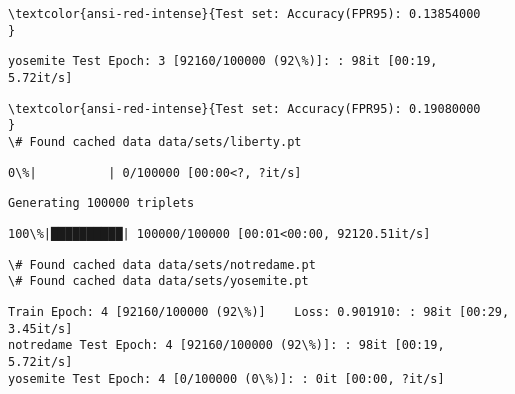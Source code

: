 \documentclass[11pt]{article}
\begin{document}
    \begin{Verbatim}[commandchars=\\\{\}]
\textcolor{ansi-red-intense}{Test set: Accuracy(FPR95): 0.13854000
}

    \end{Verbatim}

    \begin{Verbatim}[commandchars=\\\{\}]
yosemite Test Epoch: 3 [92160/100000 (92\%)]: : 98it [00:19,  5.72it/s]

    \end{Verbatim}

    \begin{Verbatim}[commandchars=\\\{\}]
\textcolor{ansi-red-intense}{Test set: Accuracy(FPR95): 0.19080000
}
\# Found cached data data/sets/liberty.pt

    \end{Verbatim}

    \begin{Verbatim}[commandchars=\\\{\}]
  0\%|          | 0/100000 [00:00<?, ?it/s]
    \end{Verbatim}

    \begin{Verbatim}[commandchars=\\\{\}]
Generating 100000 triplets

    \end{Verbatim}

    \begin{Verbatim}[commandchars=\\\{\}]
100\%|██████████| 100000/100000 [00:01<00:00, 92120.51it/s]

    \end{Verbatim}

    \begin{Verbatim}[commandchars=\\\{\}]
\# Found cached data data/sets/notredame.pt
\# Found cached data data/sets/yosemite.pt
    \end{Verbatim}

    \begin{Verbatim}[commandchars=\\\{\}]
Train Epoch: 4 [92160/100000 (92\%)]	Loss: 0.901910: : 98it [00:29,  3.45it/s]
notredame Test Epoch: 4 [92160/100000 (92\%)]: : 98it [00:19,  5.72it/s]
yosemite Test Epoch: 4 [0/100000 (0\%)]: : 0it [00:00, ?it/s]
    \end{Verbatim}
\end{document}
